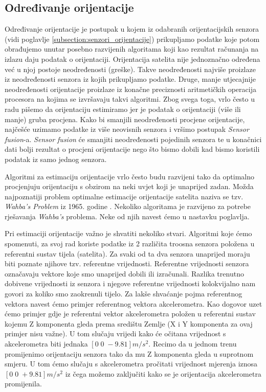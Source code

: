 \documentclass[times, utf8, diplomski, numeric]{templates/template}
\begin{document}
{{        \subsection{Određivanje orijentacije}{
        \label{subsection:odredjivanje_orijentacije}
            Određivanje orijentacije je postupak u kojem iz odabranih orijentacijskih senzora (vidi poglavlje \ref{subsection:senzori_orijentacije}) prikupljamo podatke koje potom obrađujemo unutar posebno razvijenih algoritama koji kao rezultat računanja na izlazu daju podatak o orijentaciji. Orijentacija satelita nije jednoznačno određena već u njoj postoje neodređenosti (greške). Takve neodređenosti najviše proizlaze iz neodređenosti senzora iz kojih prikupljamo podatke. Druge, manje utjecajnije neodređenosti orijentacije proizlaze iz konačne preciznosti aritmetičkih operacija procesora na kojima se izvršavaju takvi algoritmi. Zbog svega toga, vrlo često u radu pišemo da orijentaciju estimiramo jer je podatak o orijentaciji (više ili manje) gruba procjena. Kako bi smanjili neodređenosti procjene orijentacije, najčešće uzimamo podatke iz više neovisnih senzora i vršimo postupak \emph{Sensor fusion}-a. \emph{Sensor fusion} će smanjiti neodređenosti pojedinih senzora te u konačnici dati bolji rezultat o procjeni orijentacije nego što bismo dobili kad bismo koristili podatak iz samo jednog senzora.

            Algoritmi za estimaciju orijentacije vrlo često budu razvijeni tako da optimalno procjenjuju orijentaciju s obzirom na neki uvjet koji je unaprijed zadan. Možda najpoznatiji problem optimalne estimacije orijentacije satelita naziva se tzv. \emph{Wahba's Problem} iz 1965. godine \cite{wahbas_problem}. Nekoliko algoritama je razvijeno za potrebe rješavanja \emph{Wahba's} problema. Neke od njih navest ćemo u nastavku poglavlja.

            Pri estimaciji orijentacije važno je shvatiti nekoliko stvari. Algoritmi koje ćemo spomenuti, za svoj rad koriste podatke iz 2 različita troosna senzora položena u referentni sustav tijela (satelita). Za svaki od ta dva senzora unaprijed moraju biti poznate njihove tzv. referentne vrijednosti. Referentne vrijednosti senzora označavaju vektore koje smo unaprijed dobili ili izračunali. Razlika trenutno dobivene vrijednosti iz senzora i njegove referentne vrijednosti kolokvijalno nam govori za koliko smo zaokrenuli tijelo. Za lakše shvaćanje pojma referentnog vektora navest ćemo primjer referentnog vektora akcelerometra. Kao dogovor uzet ćemo primjer gdje je referentni vektor akcelerometra položen u referentni sustav kojemu Z komponenta gleda prema središtu Zemlje (X i Y komponenta za ovaj primjer nisu važne). U tom slučaju vrijedi kako će očitana vrijednost s akcelerometra biti jednaka $\left[0 \; 0 \; -9.81\right] m/s^2$. Recimo da u jednom trenu promijenimo orijentaciju senzora tako da mu Z komponenta gleda u suprotnom smjeru. U tom ćemo slučaju s akcelerometra pročitati vrijednost mjerenja iznosa $\left[0 \; 0 \; +9.81\right] m/s^2$ iz čega možemo zaključiti kako se je orijentacija akcelerometra promijenila.

}}}
\end{document}
